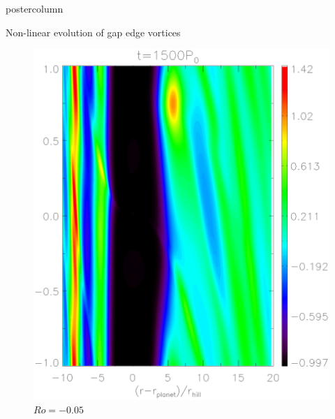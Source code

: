 \documentclass[final,hyperref={pdfpagelabels=false}]{beamer}
\begin{document}
\begin{frame}
\begin{columns}
\begin{column}{.49\textwidth}
\begin{beamercolorbox}[center,wd=\textwidth]{postercolumn}
\begin{minipage}[T]{.95\textwidth}
{\begin{block}{\Large{Non-linear evolution of gap edge
                  vortices}}
\begin{figure}
\begin{minipage}{0.3\textwidth}
                      \includegraphics[width=\textwidth]{Posterfig_After}
                      \caption{$Ro=-0.05$}
                    \end{minipage}
                    \hfill
                  \end{figure}

            \end{block}

}
\end{minipage}
\end{beamercolorbox}
\end{column}
\end{columns}
\end{frame}
\end{document}
